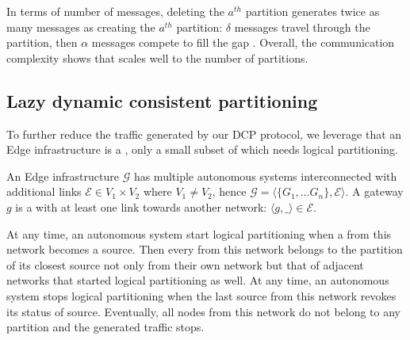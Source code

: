  In terms of number of
messages, deleting the $a^{th}$ partition generates twice as many
messages as creating the $a^{th}$ partition: $\delta$ messages travel
through the partition, then $\alpha$ messages compete to fill the gap
.  Overall, the
communication complexity shows that \NAME scales well to the number of
partitions.



\subsection{Lazy dynamic consistent partitioning}
\label{subsec:lazy}



To further reduce the traffic generated by our DCP protocol, we
leverage that an Edge infrastructure is a , only a small subset of which needs logical partitioning.

\begin{definition}
  An Edge infrastructure $\mathcal{G}$ has multiple autonomous systems
  interconnected with additional links $\mathcal{E} \in V_1 \times
  V_2$ where $V_1 \neq V_2$, hence $\mathcal{G} = \langle \{G_1,
  \ldots G_n\}, \mathcal{E} \rangle$. A \underline{g}ateway $g$ is a
  \process with at least one link towards another network: $\langle g,
  \_ \rangle \in \mathcal{E}$.
\end{definition}

At any time, an autonomous system start logical partitioning when a
\process from this network becomes a source.  Then every \process from
this network belongs to the partition of its closest source not only
from their own network but that of adjacent networks that started
logical partitioning as well.  At any time, an autonomous system stops
logical partitioning when the last source from this network revokes
its status of source. Eventually, all nodes from this network do not
belong to any partition and the generated traffic stops.

